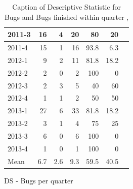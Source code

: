 \documentclass[UKenglish]{ifimaster}  %
\begin{document}
\begin{appendices}
\begin{table}[!htbp]
\begin{adjustwidth}{-2.5cm}{}
\begin{subfigure}[b]{0.3\textwidth}
{\begin{tabular}{ | l | r | r | r | r | r | r | }
2011-3 & 16 & 4 & 20 & 80 & 20 \\ \hline
2011-4 & 15 & 1 & 16 & 93.8 & 6.3 \\ \hline
2012-1 & 9 & 2 & 11 & 81.8 & 18.2 \\ \hline
2012-2 & 2 & 0 & 2 & 100 & 0 \\ \hline
2012-3 & 2 & 3 & 5 & 40 & 60 \\ \hline
2012-4 & 1 & 1 & 2 & 50 & 50 \\ \hline
2013-1 & 27 & 6 & 33 & 81.8 & 18.2 \\ \hline
2013-2 & 3 & 1 & 4 & 75 & 25 \\ \hline
2013-3 & 6 & 0 & 6 & 100 & 0 \\ \hline
2013-4 & 1 & 0 & 1 & 100 & 0 \\ \hline
Mean &6.7&2.6&9.3&59.5&40.5 \\ \hline

\end{tabular}
}
\caption{DS - Bugs per quarter}
 \label{DS:FTPQ:8}
\end{subfigure}
\end{adjustwidth}
\caption[Optional caption for list of figures]{Caption of Descriptive Statistic for Bugs and Bugs finished within quarter  , }
\label{DS:8:5} %
\end{table}


\end{appendices}
\end{document}
